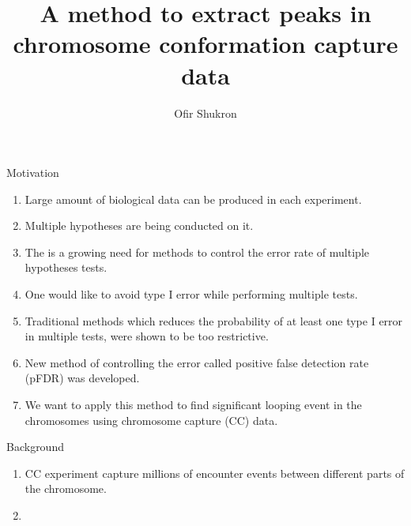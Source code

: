 \documentclass[8pt]{beamer}
\title{A method to extract peaks in chromosome conformation capture data}
\author{Ofir Shukron}
\begin{document}
\begin{frame}
\titlepage
\end{frame}

\begin{frame}{Motivation}
\begin{enumerate}
\item Large amount of biological data can be produced in each experiment. 
\item Multiple hypotheses are being conducted on it.
\item The is a growing need for methods to control the error rate of multiple hypotheses tests.
\item One would like to avoid type I error while performing multiple tests. 
\item Traditional methods which reduces the probability of at least one type I error in multiple tests, were shown to be too restrictive.
\item New method of controlling the error called positive false detection rate (pFDR) was developed. 
\item We want to apply this method to find significant looping event in the chromosomes using chromosome capture (CC) data.
\end{enumerate}
\end{frame}

\begin{frame}{Background}
\begin{enumerate}
\item CC experiment capture millions of encounter events between different parts of the chromosome. 
\item 
\end{enumerate}
\end{frame}
\end{document}
